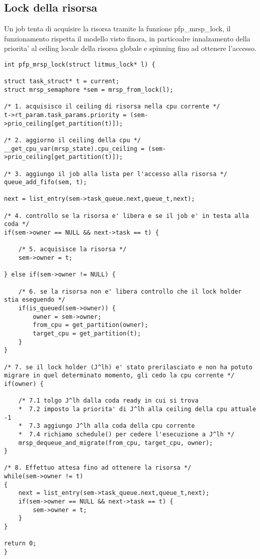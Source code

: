 \documentclass[a4paper,11pt]{article}
\begin{document}
\subsection{Lock della risorsa}

\noindent Un job tenta di acquisire la risorsa tramite la funzione pfp\_mrsp\_lock, il funzionamento rispetta il modello visto finora, in particoalre innalzamento della priorita' al ceiling locale della risorsa globale e spinning fino ad ottenere l'accesso.\\

\begin{lstlisting}
int pfp_mrsp_lock(struct litmus_lock* l) {
	
struct task_struct* t = current;
struct mrsp_semaphore *sem = mrsp_from_lock(l);

/* 1. acquisisco il ceiling di risorsa nella cpu corrente */
t->rt_param.task_params.priority = (sem->prio_ceiling[get_partition(t)]);

/* 2. aggiorno il ceiling della cpu */
__get_cpu_var(mrsp_state).cpu_ceiling = (sem->prio_ceiling[get_partition(t)]);

/* 3. aggiungo il job alla lista per l'accesso alla risorsa */
queue_add_fifo(sem, t);
		
next = list_entry(sem->task_queue.next,queue_t,next);

/* 4. controllo se la risorsa e' libera e se il job e' in testa alla coda */
if(sem->owner == NULL && next->task == t) {

	/* 5. acquisisce la risorsa */
	sem->owner = t;

} else if(sem->owner != NULL) {
	
	/* 6. se la risorsa non e' libera controllo che il lock holder stia eseguendo */
	if(is_queued(sem->owner)) {
		owner = sem->owner;
		from_cpu = get_partition(owner);
		target_cpu = get_partition(t);
	}
}

/* 7. se il lock holder (J^lh) e' stato prerilasciato e non ha potuto migrare in quel determinato momento, gli cedo la cpu corrente */
if(owner) {

	/* 7.1 tolgo J^lh dalla coda ready in cui si trova
	*  7.2 imposto la priorita' di J^lh alla ceiling della cpu attuale -1
	*  7.3 aggiungo J^lh alla coda della cpu corrente 
	*  7.4 richiamo schedule() per cedere l'esecuzione a J^lh */
	mrsp_dequeue_and_migrate(from_cpu, target_cpu, owner);
}

/* 8. Effettuo attesa fino ad ottenere la risorsa */
while(sem->owner != t)
{
	next = list_entry(sem->task_queue.next,queue_t,next);
	if(sem->owner == NULL && next->task == t) {
		sem->owner = t;
	}
} 

return 0;
}
\end{lstlisting}
\end{document}

